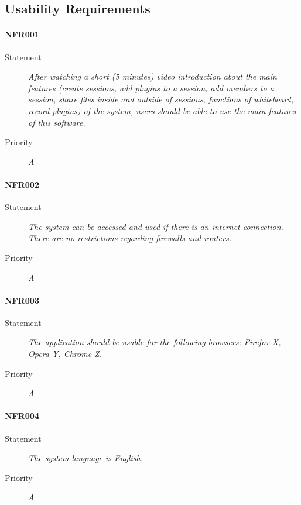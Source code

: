 \subsection{Usability Requirements}

\paragraph{NFR001}
\begin{description}
\item[Statement] \textit{After watching a short (5 minutes) video introduction about the
    main features (create sessions, add plugins to a session, add
    members to a session, share files inside and outside of sessions,
    functions of whiteboard, record plugins) of the system, users
    should be able to use the main features of this software.}
\item[Priority] \textit{A}
\end{description}

\paragraph{NFR002}
\begin{description}
\item[Statement] \textit{The system can be accessed and used if there is an
    internet connection. There are no restrictions regarding firewalls and
    routers.}
\item[Priority] \textit{A}
\end{description}

\paragraph{NFR003}
\begin{description}
\item[Statement] \textit{The application should be usable for the following
    browsers: Firefox X, Opera Y, Chrome Z.}
\item[Priority] \textit{A}
\end{description}

\paragraph{NFR004}
\begin{description}
\item[Statement] \textit{The system language is English.}
\item[Priority] \textit{A}
\end{description}